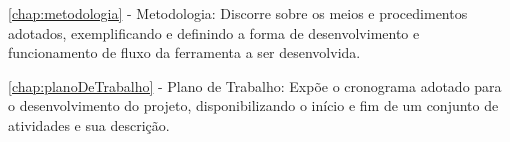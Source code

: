 \autoref{chap:metodologia} - Metodologia: Discorre sobre os meios e procedimentos adotados, exemplificando e definindo a forma de desenvolvimento e funcionamento de fluxo da ferramenta a ser desenvolvida.

\autoref{chap:planoDeTrabalho} - Plano de Trabalho: Expõe o cronograma adotado para o desenvolvimento do projeto, disponibilizando o início e fim de um conjunto de atividades e sua descrição.

